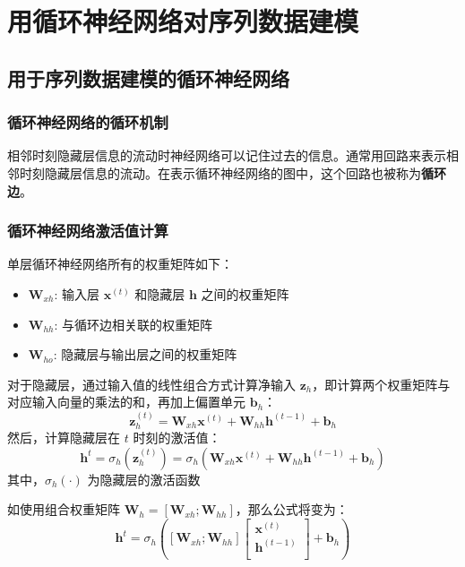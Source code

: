 \chapter{用循环神经网络对序列数据建模\label{Ch15}}
\section{用于序列数据建模的循环神经网络}
\subsection{循环神经网络的循环机制}
相邻时刻隐藏层信息的流动时神经网络可以记住过去的信息。通常用回路来表示相邻时刻隐藏层信息的流动。在表示循环神经网络的图中，这个回路也被称为\textbf{循环边}。
\subsection{循环神经网络激活值计算}
单层循环神经网络所有的权重矩阵如下：
\begin{itemize}
    \item $\bm{W}_{xh}$: 输入层 $\bm{x}^{(t)}$ 和隐藏层 $\bm{h}$ 之间的权重矩阵
    \item $\bm{W}_{hh}$: 与循环边相关联的权重矩阵
    \item $\bm{W}_{ho}$: 隐藏层与输出层之间的权重矩阵
\end{itemize}

对于隐藏层，通过输入值的线性组合方式计算净输入 $\bm{z}_h$，即计算两个权重矩阵与对应输入向量的乘法的和，再加上偏置单元 $\bm{b}_h$：
\begin{equation}
    \bm{z}_h^{(t)} = \bm{W}_{xh}\bm{x}^{(t)}+\bm{W}_{hh}\bm{h}^{(t-1)}+\bm{b}_h
\end{equation}
然后，计算隐藏层在 $t$ 时刻的激活值：
\begin{equation}
    \bm{h}^{t}=\sigma_h(\bm{z}_h^{(t)})=\sigma_h(\bm{W}_{xh}\bm{x}^{(t)}+\bm{W}_{hh}\bm{h}^{(t-1)}+\bm{b}_h)
\end{equation}
其中，$\sigma_h(\cdot)$ 为隐藏层的激活函数

如使用组合权重矩阵 $\bm{W}_h=\left[\bm{W}_{xh};\bm{W}_{hh}\right]$，那么公式将变为：
\begin{equation}
    \bm{h}^{t}=\sigma_h\left(\left[\bm{W}_{xh};\bm{W}_{hh}\right]
    \begin{bmatrix}
        \bm{x}^{(t)}   \\
        \bm{h}^{(t-1)} \\
    \end{bmatrix}+\bm{b}_h\right)
\end{equation}

